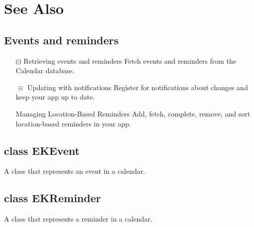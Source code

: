 \documentclass{article}
\begin{document}
\section*{See Also}

\subsection*{Events and reminders}
\begin{itemize}
    \item[$\boxminus$] Retrieving events and reminders
          Fetch events and reminders from the Calendar database.
    \item[$\equiv$] Updating with notifications
          Register for notifications about changes and keep your app up to date.
    \item[{}] Managing Location-Based Reminders
          Add, fetch, complete, remove, and sort location-based reminders in your app.
\end{itemize}

\subsection*{class EKEvent}
A class that represents an event in a calendar.

\subsection*{class EKReminder}
A class that represents a reminder in a calendar.
\newpage
\end{document}
